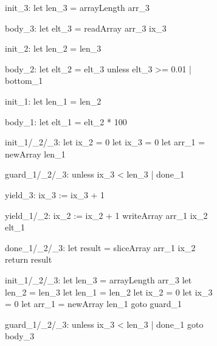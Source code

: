 \documentclass[preamble.tex]{subfiles}
\begin{document}
\providecommand\CommentsColor{\color{MidnightBlue}}
\providecommand\WhatCombinator[1]{\enrule[\CommentsColor]{0.95\textwidth}{#1}}



\begin{figure}
\vspace*{-1cm}
\hspace*{-0.5cm}
\begin{subfigure}{.55\textwidth}
\begin{loopcode}[%
    literate=
        {_1}{{\sub{map}}}3  %
        {_2}{{\sub{filt}}}2 %
        {_3}{{\sub{mfst}}}3 %
]
init_3:
  let len_3 = arrayLength arr_3

body_3:
  let elt_3 = readArray arr_3 ix_3


init_2:
  let len_2 = len_3

body_2:
  let elt_2 = elt_3
  unless elt_3 >= 0.01 | bottom_1


init_1:
  let len_1 = len_2

body_1:
  let elt_1 = elt_2 * 100


init_1/_2/_3:
  let ix_2 = 0
  let ix_3 = 0
  let arr_1 = newArray len_1

guard_1/_2/_3:
  unless ix_3 < len_3 | done_1

yield_3:
  ix_3 := ix_3 + 1

yield_1/_2:
  ix_2 := ix_2 + 1
  writeArray arr_1 ix_2 elt_1

done_1/_2/_3:
  let result = sliceArray arr_1 ix_2
  return result
\end{loopcode}
\end{subfigure}%
\begin{subfigure}{.55\textwidth}
\begin{loopcode}[%
    literate=
        {_1}{{\sub{map}}}3  %
        {_2}{{\sub{filt}}}2 %
        {_3}{{\sub{mfst}}}3 %
]
init_1/_2/_3:
  let len_3 = arrayLength arr_3
  let len_2 = len_3
  let len_1 = len_2
  let ix_2 = 0
  let ix_3 = 0
  let arr_1 = newArray len_1
  goto guard_1

guard_1/_2/_3:
  unless ix_3 < len_3 | done_1
  goto body_3


\end{loopcode}
\end{subfigure}
\end{figure}
\end{document}
